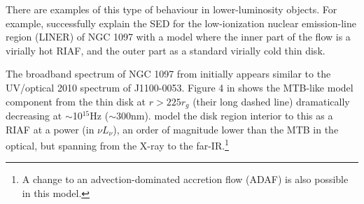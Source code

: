 \documentclass[a4paper,fleqn,usenatbib]{mnras}
\begin{document}
{There are examples of this type of behaviour in lower-luminosity
objects.  For example, \citet{Nemmen2006} successfully explain the SED
for the low-ionization nuclear emission-line region (LINER) of NGC
1097 with a model where the inner part of the flow is a virially hot
RIAF, and the outer part as a standard virially cold thin disk.

The broadband spectrum of NGC 1097 from \citet{Nemmen2006} initially
appears similar to the UV/optical 2010 spectrum of J1100-0053.  
Figure 4 in \citet{Nemmen2006} shows the MTB-like model component from the thin disk at $r>225r_{g}$
(their long dashed line) dramatically decreasing at $\sim$10$^{15}$Hz
($\sim$300nm). \citet{Nemmen2006} model the disk region interior to
this as a RIAF at a power (in $\nu L_{\nu}$), an order of magnitude
lower than the MTB in the optical, but spanning from the X-ray to the
far-IR.\footnote{A change to an advection-dominated accretion flow
(ADAF) is also possible in this model.}

}
\end{document}
